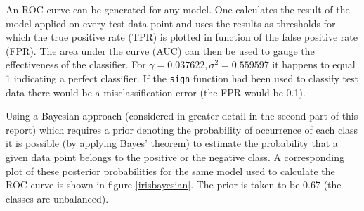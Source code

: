 An ROC curve can be generated for any model. One calculates the result of the model applied on every test data point and uses the results as thresholds for which the true positive rate (TPR) is plotted in function of the false positive rate (FPR). The area under the curve (AUC) can then be used to gauge the effectiveness of the classifier. For $\gamma=0.037622,\sigma^2=0.559597$ it happens to equal 1 indicating a perfect classifier. If the \texttt{sign} function had been used to classify test data there would be a misclassification error (the FPR would be 0.1).

\par Using a Bayesian approach (considered in greater detail in the second part of this report) which requires a prior denoting the probability of occurrence of each class it is possible (by applying Bayes' theorem) to estimate the probability that a given data point belongs to the positive or the negative class. A corresponding plot of these posterior probabilities for the same model used to calculate the ROC curve is shown in figure \ref{irisbayesian}. The prior is taken to be 0.67 (the classes are unbalanced).

\endgroup

%


